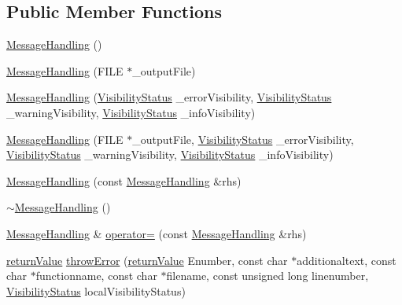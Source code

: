 \subsection*{Public Member Functions}
\begin{DoxyCompactItemize}
\item 
\hyperlink{class_message_handling_a58a64d6d798a87ed2f83092e28e7ee8b}{Message\+Handling} ()
\item 
\hyperlink{class_message_handling_af5fea91daefd158b856a091fd5dbdae4}{Message\+Handling} (F\+I\+LE $\ast$\+\_\+output\+File)
\item 
\hyperlink{class_message_handling_a65bf868c3aab4d7a29f9d61f235b65e4}{Message\+Handling} (\hyperlink{_types_8hpp_a36503475bb1fea0a7fd7087259ee63c1}{Visibility\+Status} \+\_\+error\+Visibility, \hyperlink{_types_8hpp_a36503475bb1fea0a7fd7087259ee63c1}{Visibility\+Status} \+\_\+warning\+Visibility, \hyperlink{_types_8hpp_a36503475bb1fea0a7fd7087259ee63c1}{Visibility\+Status} \+\_\+info\+Visibility)
\item 
\hyperlink{class_message_handling_aedfc5f9079f5dd454a13700e13e029d7}{Message\+Handling} (F\+I\+LE $\ast$\+\_\+output\+File, \hyperlink{_types_8hpp_a36503475bb1fea0a7fd7087259ee63c1}{Visibility\+Status} \+\_\+error\+Visibility, \hyperlink{_types_8hpp_a36503475bb1fea0a7fd7087259ee63c1}{Visibility\+Status} \+\_\+warning\+Visibility, \hyperlink{_types_8hpp_a36503475bb1fea0a7fd7087259ee63c1}{Visibility\+Status} \+\_\+info\+Visibility)
\item 
\hyperlink{class_message_handling_a9702e58c2dd05e674fc47ed44f92ff30}{Message\+Handling} (const \hyperlink{class_message_handling}{Message\+Handling} \&rhs)
\item 
\hyperlink{class_message_handling_a732439c8915c726c29833a335fb60ae7}{$\sim$\+Message\+Handling} ()
\item 
\hyperlink{class_message_handling}{Message\+Handling} \& \hyperlink{class_message_handling_a5bdc56ea0f2ba7d70b9c47a3403692a1}{operator=} (const \hyperlink{class_message_handling}{Message\+Handling} \&rhs)
\item 
\hyperlink{_message_handling_8hpp_a81d556f613bfbabd0b1f9488c0fa865e}{return\+Value} \hyperlink{class_message_handling_a257d3209e0efcb245753be9d9f89e4cf}{throw\+Error} (\hyperlink{_message_handling_8hpp_a81d556f613bfbabd0b1f9488c0fa865e}{return\+Value} Enumber, const char $\ast$additionaltext, const char $\ast$functionname, const char $\ast$filename, const unsigned long linenumber, \hyperlink{_types_8hpp_a36503475bb1fea0a7fd7087259ee63c1}{Visibility\+Status} local\+Visibility\+Status)

\end{DoxyCompactItemize}
